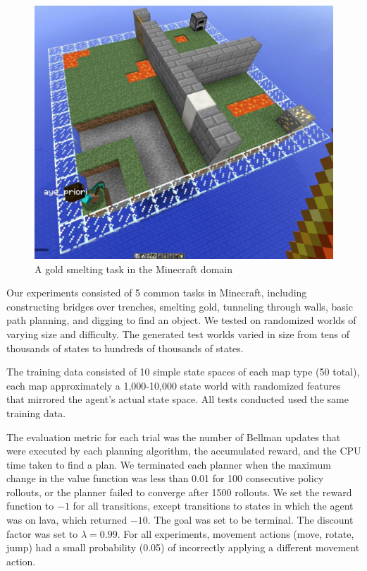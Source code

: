 \documentclass[conference]{IEEEtran}
\begin{document}
\begin{figure}[t]
\centering
\includegraphics[scale=0.13]{figures/epicworld_1.jpg}%
  \caption{A gold smelting task in the Minecraft domain}
  \label{fig:minecraft}
\end{figure}

Our experiments consisted of 5 common tasks in Minecraft, including
constructing bridges over trenches, smelting gold, tunneling
through walls, basic path planning, and digging to find an object.  We tested on 
randomized worlds of varying size and difficulty. The generated test
worlds varied in size from tens of thousands of states to hundreds of thousands of states.

The training data consisted of 10 simple state spaces of each map type
(50 total), each map approximately a 1,000-10,000 state world with
randomized features that mirrored the agent's actual state space. All tests
conducted used the same training data.

The evaluation metric for each trial was the number of Bellman updates
that were executed by each planning algorithm, the accumulated reward,
and the CPU time taken to find a plan.  We terminated each planner
when the maximum change in the value function was less than 0.01 for
100 consecutive policy rollouts, or the planner failed to converge
after 1500 rollouts.  We set the reward function to $-1$ for all
transitions, except transitions to states in which the agent was on
lava, which returned $-10$. The goal was set to be terminal. The
discount factor was set to $\lambda = 0.99$. For all experiments,
movement actions (move, rotate, jump) had a small probability (0.05)
of incorrectly applying a different movement action.
\end{document}
